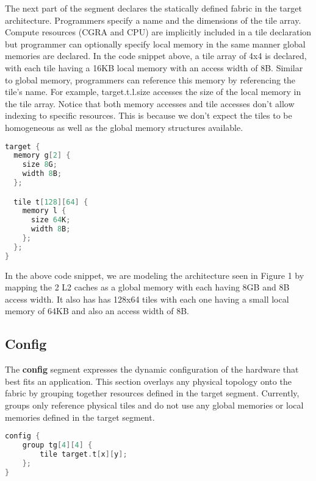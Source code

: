 \documentclass{article}
\begin{document}
The next part of the segment declares the statically defined fabric in the target architecture. Programmers specify a name and the dimensions of the tile array. Compute resources (CGRA and CPU) are implicitly included in a tile declaration but programmer can optionally specify local memory in the same manner global memories are declared. In the code snippet above, a tile array of 4x4 is declared, with each tile having a 16KB local memory with an access width of 8B. Similar to global memory, programmers can reference this memory by referencing the tile's name. For example, target.t.l.size accesses the size of the local memory in the tile array. Notice that both memory accesses and tile accesses don't allow indexing to specific resources. This is because we don't expect the tiles to be homogeneous as well as the global memory structures available. \\

\begin{minipage}[c]{\textwidth}
\begin{lstlisting}[language=C, caption=128x64 HammerBlade Instance Target Section]
target {
  memory g[2] {
    size 8G;
    width 8B;
  };

  tile t[128][64] {
    memory l {
      size 64K;
      width 8B;
    };
  };
}
\end{lstlisting}
\end{minipage}

In the above code snippet, we are modeling the architecture seen in Figure 1 by mapping the 2 L2 caches as a global memory with each having 8GB and 8B access width. It also has has 128x64 tiles with each one having a small local memory of 64KB and also an access width of 8B. \\

\subsection{Config}

The \textbf{config} segment expresses the dynamic configuration of the hardware that best fits an application. This section overlays any physical topology onto the fabric by grouping together resources defined in the target segment. Currently, groups only reference physical tiles and do not use any global memories or local memories defined in the target segment. \\ 

\begin{minipage}[c]{\textwidth}
\begin{lstlisting}[language=C, caption=Group with static parameters]
config {
    group tg[4][4] {
        tile target.t[x][y];
    };
}
\end{lstlisting}
\end{minipage}
\end{document}
